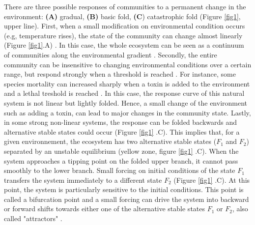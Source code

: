 There are three possible responses of communities to a permanent
change in the environment: \textbf{(A)} gradual, \textbf{(B)} basic fold,
\textbf{(C}) catastrophic fold \cite{Scheffer2001} (Figure \ref{fig1}, upper
line). First, when a small modification on environmental condition occurs (e.g,
temperature rises), the state of the community can change almost linearly
(Figure \ref{fig1}.A) \cite{Scheffer2001,Scheffer2009}. In this case, the whole
ecosystem can be seen as a continuum of communities along the environmental
gradient \cite{Scheffer2001,Scheffer2009,scheffer2009critical}. Secondly, the
entire community can be insensitive to changing environmental conditions over a
certain range, but respond strongly when a threshold is reached
\cite{scheffer2009critical}. For instance, some species mortality can increased
sharply when a toxin is added to the environment and a lethal treshold is
reached \cite{scheffer2009critical}. In this case, the response curve of this
natural system is not linear but lightly folded. Hence, a small change of the
environment such as adding a toxin, can lead to major changes in the  community
state. Lastly, in some strong non-linear systems, the response can be folded
backwards and alternative stable states could occur (Figure \ref{fig1} .C). This
implies that, for a given environnement, the ecosystem has two alternative
stable states ($F_1$ and $F_2$) separated by an unstable equilibrium (yellow
zone, figure \ref{fig1} .C). When the system approaches a tipping point on the
folded upper branch, it cannot pass smoothly to the lower branch. Small forcing
on initial conditions of the state $F_1$ transfers the system immediately to a
different state $F_2$ (Figure \ref{fig1} .C). At this point, the system is
particularly sensitive to the initial conditions. This point is called a
bifurcation point and a small forcing can drive the system into backward or
forward shifts towards either one of the alternative stable states $F_1$ or
$F_2$, also called "attractors" \cite{scheffer2009critical}. \\



